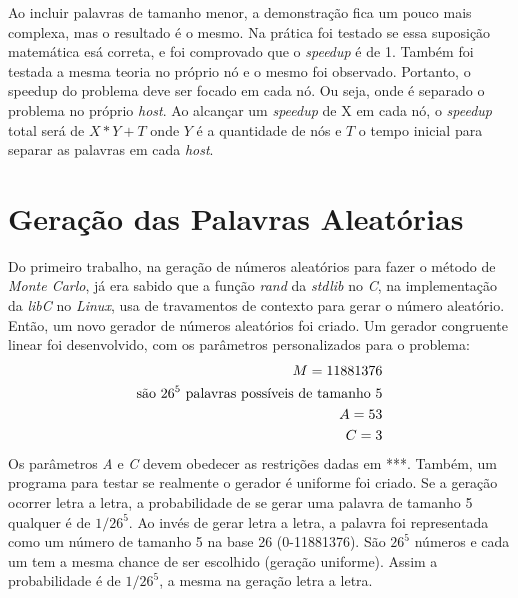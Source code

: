 \documentclass[a4paper]{article}
\begin{document}
\indent Ao incluir palavras de tamanho menor, a demonstração fica um pouco mais complexa, mas o resultado é o mesmo. Na prática foi testado se essa suposição matemática esá correta, e foi comprovado que o \emph{speedup} é de 1. Também foi testada a mesma teoria no próprio nó e o mesmo foi observado. Portanto, o speedup do problema deve ser focado em cada nó. Ou seja, onde é separado o problema no próprio \emph{host}. Ao alcançar um \emph{speedup} de X em cada nó, o \emph{speedup} total será de \begin{math}X*Y + T\end{math} onde \begin{math}Y\end{math} é a quantidade de nós e \begin{math}T\end{math} o tempo inicial para separar as palavras em cada \emph{host}.

\section{Geração das Palavras Aleatórias}
\indent \indent Do primeiro trabalho, na geração de números aleatórios para fazer o método de \emph{Monte Carlo}, já era sabido que a função \emph{rand} da \emph{stdlib} no \emph{C}, na implementação da \emph{libC} no \emph{Linux}, usa de travamentos de contexto para gerar o número aleatório. Então, um novo gerador de números aleatórios foi criado. Um gerador congruente linear foi desenvolvido, com os parâmetros personalizados para o problema:
\begin{eqnarray*}
	M = 11881376 \\\textrm{são \begin{math}26^5\end{math} palavras possíveis de tamanho 5}\\
	A = 53\\
	C = 3\\
\end{eqnarray*}	
\indent Os parâmetros \emph{A} e \emph{C} devem obedecer as restrições dadas em ***. Também, um programa para testar se realmente o gerador é uniforme foi criado. Se a geração ocorrer letra a letra, a probabilidade de se gerar uma palavra de tamanho 5 qualquer é de \begin{math}1/26^5\end{math}. Ao invés de gerar letra a letra, a palavra foi representada como um número de tamanho 5 na base 26 (0-11881376). São \begin{math}26^5\end{math} números e cada um tem a mesma chance de ser escolhido (geração uniforme). Assim a probabilidade é de \begin{math}1/26^5\end{math}, a mesma na geração letra a letra.
\end{document}
